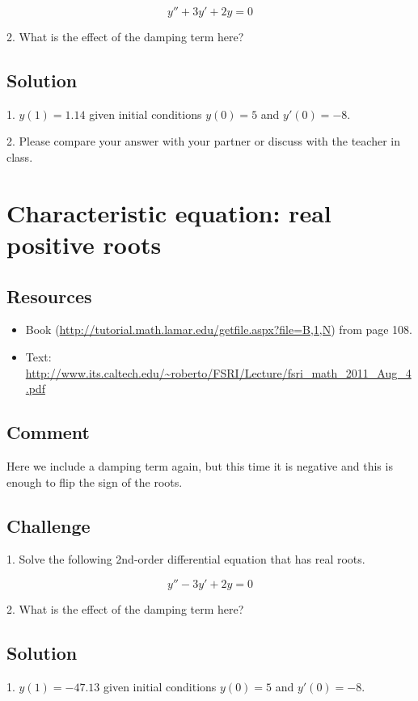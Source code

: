\begin{equation}
    \label{eq:ccrrpb}
    y'' + 3 y' + 2 y = 0
\end{equation}

2. What is the effect of the damping term here?

\subsection*{Solution}
1. $y(1) = 1.14$ given initial conditions $y(0)=5$ and $y'(0)=-8$.

2. Please compare your answer with your partner or discuss with the teacher in class.




\newpage
\section{Characteristic equation: real positive roots}

\subsection*{Resources}
\begin{itemize}
    \item Book (\url{http://tutorial.math.lamar.edu/getfile.aspx?file=B,1,N}) from page 108.
    \item Text: \url{http://www.its.caltech.edu/~roberto/FSRI/Lecture/fsri_math_2011_Aug_4.pdf}
\end{itemize}

\subsection*{Comment}
Here we include a damping term again, but this time it is negative and this is enough to flip the sign of the roots.

\subsection*{Challenge}
1. Solve the following 2nd-order differential equation that has real roots. 

\begin{equation}
    y'' - 3 y' + 2 y = 0
\end{equation}

2. What is the effect of the damping term here?

\subsection*{Solution}
1. $y(1) = -47.13$ given initial conditions $y(0)=5$ and $y'(0)=-8$.

